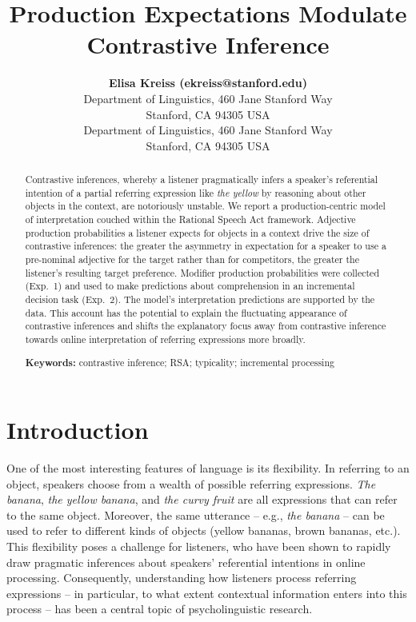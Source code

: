 \documentclass[10pt,letterpaper]{article}
\title{Production Expectations Modulate Contrastive Inference}
\author{{\large \bf Elisa Kreiss (ekreiss@stanford.edu)} \\
 Department of Linguistics, 460 Jane Stanford Way \\
 Stanford, CA 94305 USA
 \AND {\large \bf Judith Degen (jdegen@stanford.edu)} \\
 Department of Linguistics, 460 Jane Stanford Way \\
 Stanford, CA 94305 USA}
\begin{document}
\maketitle

\begin{abstract}
Contrastive inferences, whereby a listener pragmatically infers a speaker's referential intention of a partial referring expression like \emph{the yellow} by reasoning about other objects in the context, are notoriously unstable. We report a production-centric model of interpretation couched within the Rational Speech Act framework. Adjective production probabilities a listener expects for objects in a context drive the size of contrastive inferences: the greater the asymmetry in expectation for a speaker to use a pre-nominal adjective for the target rather than for competitors, the greater the listener's resulting target preference. Modifier production probabilities were collected (Exp.~1) and used to make predictions about comprehension in an incremental decision task (Exp.~2). The model's interpretation predictions are supported by the data. This account has the potential to explain the fluctuating appearance of contrastive inferences and shifts the explanatory focus away from contrastive inference towards online interpretation of referring expressions more broadly.

\textbf{Keywords:} 
contrastive inference; RSA; typicality; incremental processing
\end{abstract}

\section{Introduction}

One of the most interesting features of language is its flexibility. In referring to an object, speakers choose from a wealth of possible referring expressions. \textit{The banana}, \textit{the yellow banana}, and \textit{the curvy fruit} are all expressions that can refer to the same object. Moreover, the same utterance -- e.g., \textit{the banana} -- can be used to refer to different kinds of objects (yellow bananas, brown bananas, etc.). This flexibility poses a challenge for listeners, who have been shown to rapidly draw pragmatic inferences about speakers' referential intentions in online processing. Consequently, understanding how listeners process referring expressions -- in particular, to what extent contextual information enters into this process -- has been a central topic of psycholinguistic research.
\end{document}
